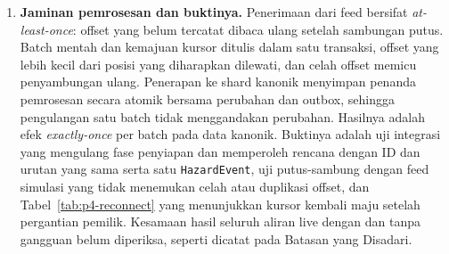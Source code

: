 \begin{enumerate}
\item \textbf{Jaminan pemrosesan dan buktinya.} Penerimaan dari feed bersifat \emph{at-least-once}: offset yang belum tercatat dibaca ulang setelah sambungan putus. Batch mentah dan kemajuan kursor ditulis dalam satu transaksi, offset yang lebih kecil dari posisi yang diharapkan dilewati, dan celah offset memicu penyambungan ulang. Penerapan ke shard kanonik menyimpan penanda pemrosesan secara atomik bersama perubahan dan outbox, sehingga pengulangan satu batch tidak menggandakan perubahan. Hasilnya adalah efek \emph{exactly-once} per batch pada data kanonik. Buktinya adalah uji integrasi yang mengulang fase penyiapan dan memperoleh rencana dengan ID dan urutan yang sama serta satu \texttt{HazardEvent}, uji putus-sambung dengan feed simulasi yang tidak menemukan celah atau duplikasi offset, dan Tabel~\ref{tab:p4-reconnect} yang menunjukkan kursor kembali maju setelah pergantian pemilik. Kesamaan hasil seluruh aliran live dengan dan tanpa gangguan belum diperiksa, seperti dicatat pada Batasan yang Disadari.
\end{enumerate}
